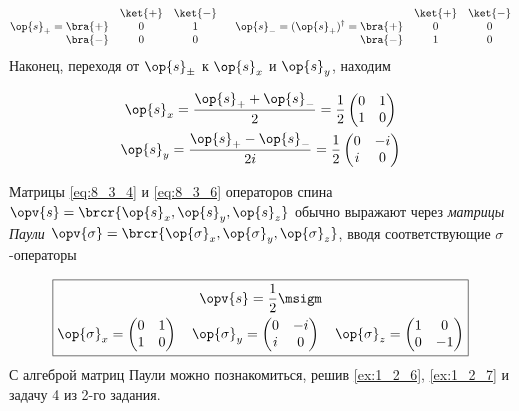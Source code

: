 \begin{equation}
\label{eq:8_3_5}
\op{s}_{+} = 
\begin{matrix}
            & \ket{+} & \ket{-} \\
\bra{+} &  0         & 1         \\
\bra{-}  &  0         & 0         
\end{matrix}
~~~~~\op{s}_{-} = (\op{s}_{+})^\dag = 
\begin{matrix}
            & \ket{+} & \ket{-} \\
\bra{+} &  0         & 0         \\
\bra{-}  &  1         & 0         
\end{matrix}
\end{equation}%
%
Наконец, переходя от $\op{s}_{\pm}$ к $\op{s}_x$ и $\op{s}_y$, находим

\begin{equation}
\label{eq:8_3_6}
\begin{gathered}
\op{s}_x = \frac{\op{s}_{+} + \op{s}_{-}}{2} = \frac{1}{2} \left (
  \begin{matrix}
  0 & 1 \\
  1 & 0 
  \end{matrix}
\right )
\\
\op{s}_y = \frac{\op{s}_{+} - \op{s}_{-}}{2i} = \frac{1}{2} \left (
  \begin{matrix}
  0 & -i \\
  i & 0 
  \end{matrix}
\right )
\end{gathered}
\end{equation}

Матрицы \eqref{eq:8_3_4} и \eqref{eq:8_3_6} операторов спина $\opv{s} = \brcr{\op{s}_x, \op{s}_y, \op{s}_z}$ обычно выражают через {\em матрицы Паули} $\opv{\sigma} = \brcr{\op{\sigma}_x, \op{\sigma}_y, \op{\sigma}_z}$, вводя соответствующие $\sigma$-операторы

$$
\boxed{
\begin{gathered}
  \opv{s}= \frac{1}{2}\msigm\\
  \op{\sigma}_x = \left (
    \begin{matrix}
    0 & 1 \\
    1 & 0 
    \end{matrix}
  \right )
  ~~~
  \op{\sigma}_y = \left (
    \begin{matrix}
    0 & -i \\
    i & 0 
    \end{matrix}
  \right )
  ~~~
  \op{\sigma}_z = \left (
    \begin{matrix}
    1 & 0 \\
    0 & -1 
    \end{matrix}
  \right)
\end{gathered}
}
$$%
%
С алгеброй матриц Паули можно познакомиться, решив \cref{ex:1_2_6}, \cref{ex:1_2_7} и задачу 4 из 2-го задания.

